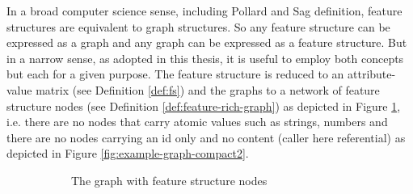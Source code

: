     In a broad computer science sense, including Pollard and Sag definition, feature structures are equivalent to graph structures. So any feature structure can be expressed as a graph and any graph can be expressed as a feature structure. But in a narrow sense, as adopted in this thesis, it is useful to employ both concepts but each for a given purpose. The feature structure is reduced to an attribute-value matrix (see Definition \ref{def:fs}) and the graphs to a network of feature structure nodes (see Definition \ref{def:feature-rich-graph}) as depicted in Figure \ref{fig:example-graph-compact1}, i.e. there are no nodes that carry atomic values such as strings, numbers and there are no nodes carrying an id only and no content (caller here referential) as depicted in Figure \ref{fig:example-graph-compact2}.

    \begin{figure}[!ht]
        \centering
        \begin{subfigure}[b]{0.45\textwidth}
            \centering
            \caption{The graph with feature structure nodes}
            \label{fig:example-graph-compact1}
        \end{subfigure}%
        \quad\quad
        \begin{subfigure}[b]{0.45\textwidth}
            \centering
\end{subfigure}
\end{figure}
